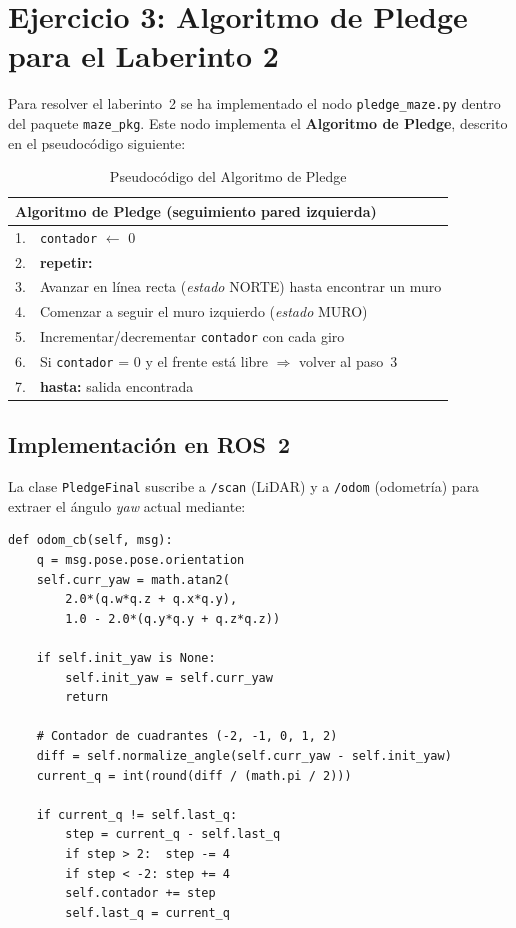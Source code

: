 \section{Ejercicio 3: Algoritmo de Pledge para el Laberinto 2}

Para resolver el laberinto~2 se ha implementado el nodo \texttt{pledge\_maze.py}
dentro del paquete \texttt{maze\_pkg}. Este nodo implementa el
\textbf{Algoritmo de Pledge}, descrito en el pseudocódigo siguiente:

\begin{table}[H]
\centering
\begin{tabular}{ll}
\toprule
\multicolumn{2}{l}{\textbf{Algoritmo de Pledge (seguimiento pared izquierda)}} \\
\midrule
1. & \texttt{contador} $\leftarrow$ 0 \\
2. & \textbf{repetir:} \\
3. & \quad Avanzar en línea recta (\textit{estado} NORTE) hasta encontrar un muro \\
4. & \quad Comenzar a seguir el muro izquierdo (\textit{estado} MURO) \\
5. & \quad Incrementar/decrementar \texttt{contador} con cada giro \\
6. & \quad Si \texttt{contador} = 0 y el frente está libre $\Rightarrow$ volver al paso~3 \\
7. & \textbf{hasta:} salida encontrada \\
\bottomrule
\end{tabular}
\caption{Pseudocódigo del Algoritmo de Pledge}
\end{table}

\subsection*{Implementación en ROS~2}

La clase \texttt{PledgeFinal} suscribe a \texttt{/scan} (LiDAR) y a \texttt{/odom}
(odometría) para extraer el ángulo \textit{yaw} actual mediante:

\begin{lstlisting}[style=python]
def odom_cb(self, msg):
    q = msg.pose.pose.orientation
    self.curr_yaw = math.atan2(
        2.0*(q.w*q.z + q.x*q.y),
        1.0 - 2.0*(q.y*q.y + q.z*q.z))

    if self.init_yaw is None:
        self.init_yaw = self.curr_yaw
        return

    # Contador de cuadrantes (-2, -1, 0, 1, 2)
    diff = self.normalize_angle(self.curr_yaw - self.init_yaw)
    current_q = int(round(diff / (math.pi / 2)))

    if current_q != self.last_q:
        step = current_q - self.last_q
        if step > 2:  step -= 4
        if step < -2: step += 4
        self.contador += step
        self.last_q = current_q
\end{lstlisting}

